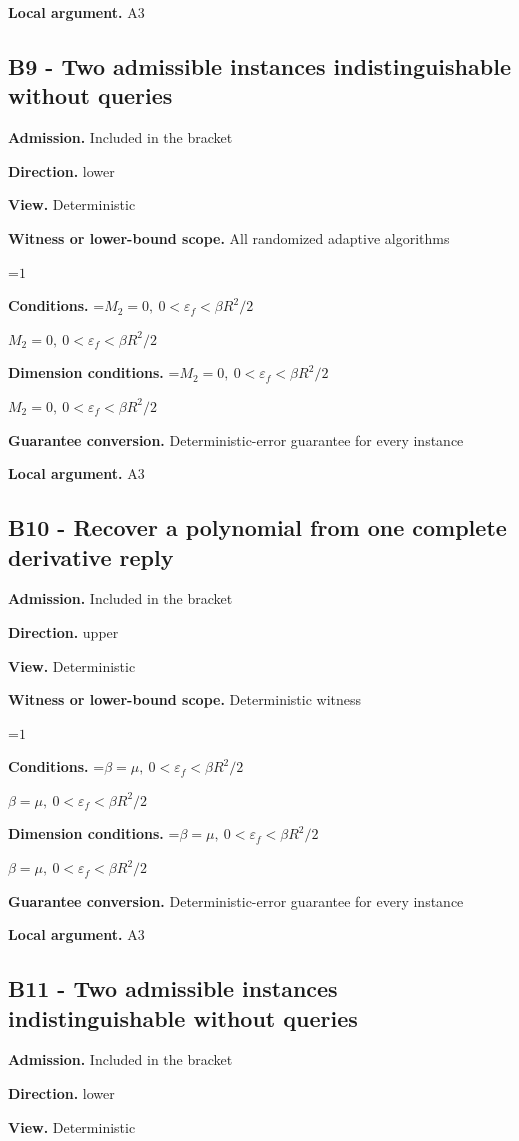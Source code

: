 \documentclass[10pt,a4paper]{article}
\newcommand{\AtlasMath}[1]{\par\begingroup\centering\setbox0=\hbox{$\displaystyle #1$}\ifdim\wd0>1.4\linewidth\typeout{ATLAS WIDE FORMULA: \the\wd0}\fi\ifdim\wd0>\linewidth\resizebox{\linewidth}{!}{\box0}\else\box0\fi\par\endgroup}
\newcommand{\AtlasInlineMath}[1]{\begingroup\setbox0=\hbox{$#1$}\ifdim\wd0>.4\linewidth\endgroup\AtlasMath{#1}\else\endgroup$#1$\fi}
\begin{document}
\textbf{Local argument.} A3

\subsection{B9 - Two admissible instances indistinguishable without queries}
\textbf{Admission.} Included in the bracket

\textbf{Direction.} lower

\textbf{View.} Deterministic

\textbf{Witness or lower-bound scope.} All randomized adaptive algorithms

\AtlasMath{1}
\textbf{Conditions.} \AtlasInlineMath{M_2=0,\ 0<\varepsilon_f<\beta R^2/2}

\textbf{Dimension conditions.} \AtlasInlineMath{M_2=0,\ 0<\varepsilon_f<\beta R^2/2}

\textbf{Guarantee conversion.} Deterministic-error guarantee for every instance

\textbf{Local argument.} A3

\subsection{B10 - Recover a polynomial from one complete derivative reply}
\textbf{Admission.} Included in the bracket

\textbf{Direction.} upper

\textbf{View.} Deterministic

\textbf{Witness or lower-bound scope.} Deterministic witness

\AtlasMath{1}
\textbf{Conditions.} \AtlasInlineMath{\beta=\mu,\ 0<\varepsilon_f<\beta R^2/2}

\textbf{Dimension conditions.} \AtlasInlineMath{\beta=\mu,\ 0<\varepsilon_f<\beta R^2/2}

\textbf{Guarantee conversion.} Deterministic-error guarantee for every instance

\textbf{Local argument.} A3

\subsection{B11 - Two admissible instances indistinguishable without queries}
\textbf{Admission.} Included in the bracket

\textbf{Direction.} lower

\textbf{View.} Deterministic
\end{document}

